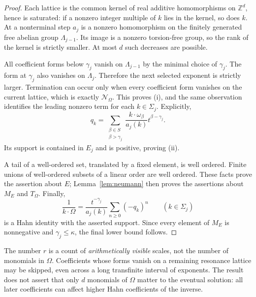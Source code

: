 \documentclass[11pt,letterpaper]{article}
\theoremstyle{definition}
\theoremstyle{remark}
\newcommand{\Z}{\mathbb Z}
\newcommand{\res}{\mathcal N_{\Omega}}
\numberwithin{equation}{section}
\begin{document}
\begin{proof}
Each lattice is the common kernel of real additive homomorphisms on
$\Z^d$, hence is saturated: if a nonzero integer multiple of $k$ lies in the
kernel, so does $k$.  At a nonterminal step $a_j$ is a nonzero homomorphism
on the finitely generated free abelian group $\Lambda_{j-1}$.  Its image is a
nonzero torsion-free group, so the rank of the kernel is strictly smaller.
At most $d$ such decreases are possible.

All coefficient forms below $\gamma_j$ vanish on $\Lambda_{j-1}$ by the
minimal choice of $\gamma_j$.  The form at $\gamma_j$ also vanishes on
$\Lambda_j$.  Therefore the next selected exponent is strictly larger.
Termination can occur only when every coefficient form vanishes on the
current lattice, which is exactly $\res$.  This proves (i), and the same
observation identifies the leading nonzero term for each $k\in\Sigma_j$.
Explicitly,
\[
 q_k=\sum_{\substack{\beta\in S\\\beta>\gamma_j}}
       \frac{k\cdot\omega_\beta}{a_j(k)}t^{\beta-\gamma_j}.
\]
Its support is contained in $E_j$ and is positive, proving (ii).

A tail of a well-ordered set, translated by a fixed element, is well
ordered.  Finite unions of well-ordered subsets of a linear order are well
ordered.  These facts prove the assertion about $E$; Lemma~\ref{lem:neumann}
then proves the assertions about $M_E$ and $T_\Omega$.  Finally,
\begin{equation}\label{eq:reciprocal}
 \frac1{k\cdot\Omega}=
 \frac{t^{-\gamma_j}}{a_j(k)}
 \sum_{n\ge0}(-q_k)^n\qquad(k\in\Sigma_j)
\end{equation}
is a Hahn identity with the asserted support.  Since every element of $M_E$
is nonnegative and $\gamma_j\le\kappa$, the final lower bound follows.
\end{proof}

The number $r$ is a count of \emph{arithmetically visible} scales, not the
number of monomials in $\Omega$.  Coefficients whose forms vanish on a
remaining resonance lattice may be skipped, even across a long transfinite
interval of exponents.  The result does not assert that only $d$ monomials of
$\Omega$ matter to the eventual solution: all later coefficients can affect
higher Hahn coefficients of the inverse.
\end{document}
